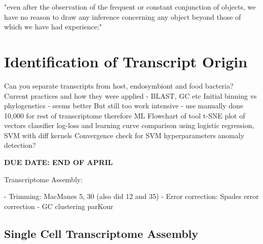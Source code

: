 \graphicspath{{chapters/4.Chapter_2/figures}}

\begin{savequote}[75mm]
"even after the observation of the frequent or constant conjunction of objects, we have no reason to draw any inference concerning any object beyond those of which we have had experience;"
\end{savequote}


\chapter{Identification of Transcript Origin}

Can you separate transcripts from host, endosymbiont and food bacteria?
Current practices and how they were applied - BLAST, GC etc
Initial binning vs phylogenetics - seems better
But still too work intensive - use manually done 10,000 for rest of transcriptome therefore ML
Flowchart of tool 
t-SNE plot of vectors
classifier log-loss and learning curve comparison using logistic regression, SVM with diff kernels
Convergence check for SVM hyperparameters
anomaly detection?

\bf{DUE DATE: END OF APRIL}



Transcriptome Assembly:

- Trimming: MacManes 5, 30 (also did 12 and 35)
- Error correction: Spades error correction
- GC clustering parKour
\section{Single Cell Transcriptome Assembly}

